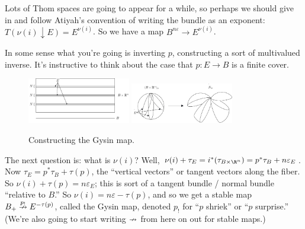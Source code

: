 \begin{enumerate}
Lots of Thom spaces are going to appear for a while, so perhaps we should give in and follow Atiyah's convention of writing the bundle as an exponent: $T(\nu(i) \downarrow E) = E^{\nu(i)}$.  So we have a map $B^{n\varepsilon} \to E^{\nu(i)}$.

In some sense what you're going is inverting $p$, constructing a sort of multivalued inverse.  It's instructive to think about the case that $p: E \to B$ is a finite cover.
\begin{figure}[ht!]
\centering\includegraphics[width=0.4\textwidth]{figures/figure38-1.pdf}
\newline
\centering\includegraphics[width=0.4\textwidth]{figures/figure38-2.pdf}
\caption{\small Constructing the Gysin map.}
\end{figure}

The next question is: what is $\nu(i)$?  Well, $\nu(i) + \tau_E = i^*(\tau_{B \times \R^n}) = p^* \tau_B + n\varepsilon_E$.  Now $\tau_E = p^* \tau_B + \tau(p)$, the ``vertical vectors'' or tangent vectors along the fiber.  So $\nu(i) + \tau(p) = n \varepsilon_E$; this is sort of a tangent bundle / normal bundle ``relative to $B$.''  So $\nu(i) = n \varepsilon - \tau(p)$, and so we get a stable map $B_+ \stackrel{p_!}{\nrightarrow} E^{-\tau(p)}$, called the Gysin map, denoted $p_!$ for ``$p$ shriek'' or ``$p$ surprise.''  (We're also going to start writing $\nrightarrow$ from here on out for stable maps.)


\end{enumerate}
